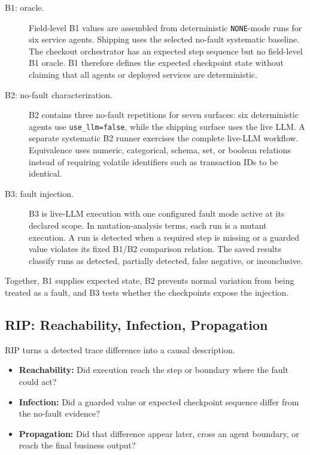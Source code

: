 \documentclass[sigconf,review,anonymous,balance=false]{acmart}
\begin{document}
\begin{description}
  \item[B1: oracle.] Field-level B1 values are assembled from deterministic
            \texttt{NONE}-mode runs for six service agents. Shipping uses the
        selected no-fault systematic baseline. The checkout orchestrator has an
        expected step sequence but no field-level B1 oracle. B1 therefore
        defines the expected checkpoint state without claiming that all agents
        or deployed services are deterministic.
  \item[B2: no-fault characterization.] B2 contains three no-fault repetitions
        for seven surfaces: six deterministic agents use
        \texttt{use\_llm=false}, while the shipping surface uses the live LLM.
        A separate systematic B2 runner exercises the complete live-LLM
        workflow. Equivalence uses numeric, categorical, schema, set, or boolean
        relations instead of requiring volatile identifiers such as transaction
        IDs to be identical.
  \item[B3: fault injection.] B3 is live-LLM execution with one configured fault
        mode active at its declared scope. In mutation-analysis terms, each run is a
        mutant execution. A run is detected when a required step is missing or
        a guarded value violates its fixed B1/B2 comparison relation. The saved
        results classify runs as detected, partially detected, false negative,
        or inconclusive.
\end{description}

Together, B1 supplies expected state, B2 prevents normal variation from being
treated as a fault, and B3 tests whether the checkpoints expose the injection.

\subsection{RIP: Reachability, Infection, Propagation}

RIP turns a detected trace difference into a causal description.

\begin{itemize}
  \item \textbf{Reachability:} Did execution reach the step or boundary where
        the fault could act?
  \item \textbf{Infection:} Did a guarded value or expected checkpoint sequence
        differ from the no-fault evidence?
  \item \textbf{Propagation:} Did that difference appear later, cross an agent
        boundary, or reach the final business output?
\end{itemize}
\end{document}
